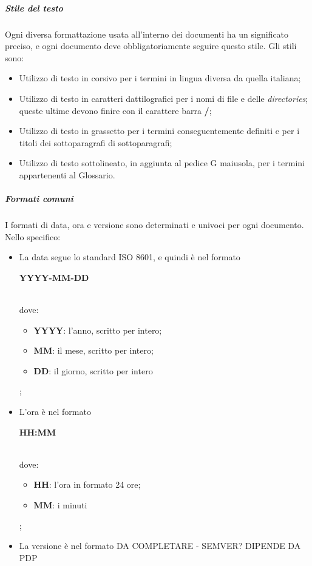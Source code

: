 \documentclass[../norme-di-progetto.tex]{subfiles}
\begin{document}
\subparagraph{Stile del testo}
Ogni diversa formattazione usata all'interno dei documenti ha un significato preciso, e ogni documento deve obbligatoriamente seguire questo stile. Gli stili sono:
\begin{itemize}
  \item Utilizzo di testo in corsivo per i termini in lingua diversa da quella italiana;
  \item Utilizzo di testo in caratteri dattilografici per i nomi di file e delle \textit{directories}; queste ultime devono finire con il carattere barra \textbf{/};
  \item Utilizzo di testo in grassetto per i termini conseguentemente definiti e per i titoli dei sottoparagrafi di sottoparagrafi;
  \item Utilizzo di testo sottolineato, in aggiunta al pedice G maiusola, per i termini appartenenti al Glossario.
\end{itemize}

\subparagraph{Formati comuni}
I formati di data, ora e versione sono determinati e univoci per ogni documento. Nello specifico:
\begin{itemize}
  \item La data segue lo standard ISO 8601, e quindi è nel formato \\ \centerline{\textbf{YYYY-MM-DD}} \\ dove:
  \begin{itemize}
    \item \textbf{YYYY}: l'anno, scritto per intero;
    \item \textbf{MM}: il mese, scritto per intero;
    \item \textbf{DD}: il giorno, scritto per intero
  \end{itemize};
  \item L'ora è nel formato \\ \centerline{\textbf{HH:MM}} \\ dove:
  \begin{itemize}
    \item \textbf{HH}: l'ora in formato 24 ore;
    \item \textbf{MM}: i minuti
  \end{itemize};
  \item La versione è nel formato DA COMPLETARE - SEMVER? DIPENDE DA PDP
\end{itemize}
\end{document}
